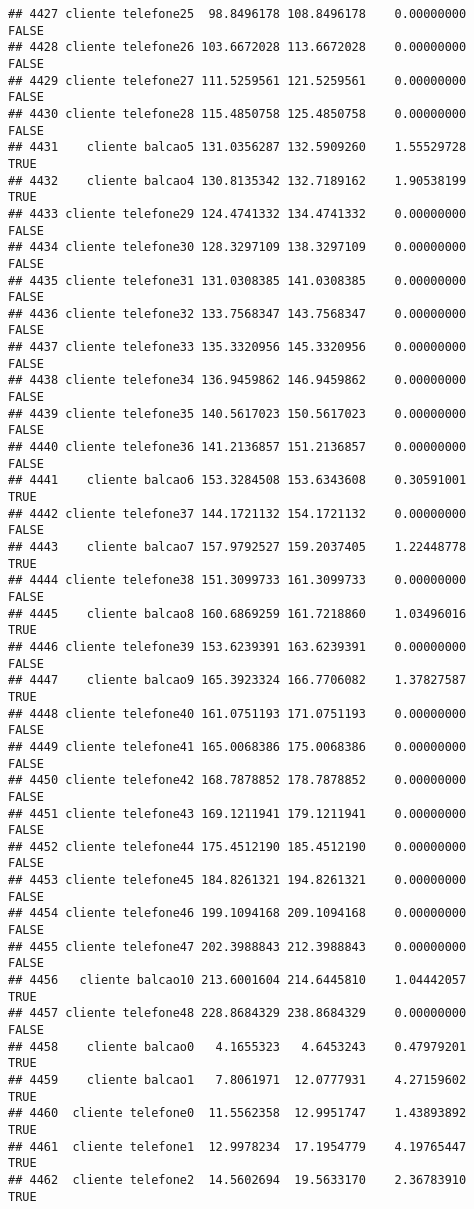 \documentclass[
]{article}
\begin{document}
\begin{verbatim}
## 4427 cliente telefone25  98.8496178 108.8496178    0.00000000    FALSE
## 4428 cliente telefone26 103.6672028 113.6672028    0.00000000    FALSE
## 4429 cliente telefone27 111.5259561 121.5259561    0.00000000    FALSE
## 4430 cliente telefone28 115.4850758 125.4850758    0.00000000    FALSE
## 4431    cliente balcao5 131.0356287 132.5909260    1.55529728     TRUE
## 4432    cliente balcao4 130.8135342 132.7189162    1.90538199     TRUE
## 4433 cliente telefone29 124.4741332 134.4741332    0.00000000    FALSE
## 4434 cliente telefone30 128.3297109 138.3297109    0.00000000    FALSE
## 4435 cliente telefone31 131.0308385 141.0308385    0.00000000    FALSE
## 4436 cliente telefone32 133.7568347 143.7568347    0.00000000    FALSE
## 4437 cliente telefone33 135.3320956 145.3320956    0.00000000    FALSE
## 4438 cliente telefone34 136.9459862 146.9459862    0.00000000    FALSE
## 4439 cliente telefone35 140.5617023 150.5617023    0.00000000    FALSE
## 4440 cliente telefone36 141.2136857 151.2136857    0.00000000    FALSE
## 4441    cliente balcao6 153.3284508 153.6343608    0.30591001     TRUE
## 4442 cliente telefone37 144.1721132 154.1721132    0.00000000    FALSE
## 4443    cliente balcao7 157.9792527 159.2037405    1.22448778     TRUE
## 4444 cliente telefone38 151.3099733 161.3099733    0.00000000    FALSE
## 4445    cliente balcao8 160.6869259 161.7218860    1.03496016     TRUE
## 4446 cliente telefone39 153.6239391 163.6239391    0.00000000    FALSE
## 4447    cliente balcao9 165.3923324 166.7706082    1.37827587     TRUE
## 4448 cliente telefone40 161.0751193 171.0751193    0.00000000    FALSE
## 4449 cliente telefone41 165.0068386 175.0068386    0.00000000    FALSE
## 4450 cliente telefone42 168.7878852 178.7878852    0.00000000    FALSE
## 4451 cliente telefone43 169.1211941 179.1211941    0.00000000    FALSE
## 4452 cliente telefone44 175.4512190 185.4512190    0.00000000    FALSE
## 4453 cliente telefone45 184.8261321 194.8261321    0.00000000    FALSE
## 4454 cliente telefone46 199.1094168 209.1094168    0.00000000    FALSE
## 4455 cliente telefone47 202.3988843 212.3988843    0.00000000    FALSE
## 4456   cliente balcao10 213.6001604 214.6445810    1.04442057     TRUE
## 4457 cliente telefone48 228.8684329 238.8684329    0.00000000    FALSE
## 4458    cliente balcao0   4.1655323   4.6453243    0.47979201     TRUE
## 4459    cliente balcao1   7.8061971  12.0777931    4.27159602     TRUE
## 4460  cliente telefone0  11.5562358  12.9951747    1.43893892     TRUE
## 4461  cliente telefone1  12.9978234  17.1954779    4.19765447     TRUE
## 4462  cliente telefone2  14.5602694  19.5633170    2.36783910     TRUE

\end{verbatim}
\end{document}
